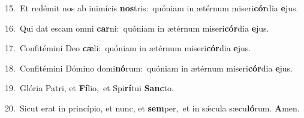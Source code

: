 {\numbfont\textcolor{\numbcolor}{15.}}~Et redémit nos ab inimícis \textbf{nos}\-tris:~\star quóniam in ætérnum miseri\-\textbf{cór}\-dia \textbf{e}\-jus.\par
{\numbfont\textcolor{\numbcolor}{16.}}~Qui dat escam omni \textbf{car}\-ni:~\star quóniam in ætérnum miseri\-\textbf{cór}\-dia \textbf{e}\-jus.\par
{\numbfont\textcolor{\numbcolor}{17.}}~Confitémini Deo \textbf{cæ}\-li:~\star quóniam in ætérnum miseri\-\textbf{cór}\-dia \textbf{e}\-jus.\par
{\numbfont\textcolor{\numbcolor}{18.}}~Confitémini Dómino domi\-\textbf{nó}\-rum:~\star quóniam in ætérnum miseri\-\textbf{cór}\-dia \textbf{e}\-jus.\par
{\numbfont\textcolor{\numbcolor}{19.}}~Glória Patri, et \textbf{Fí}\-lio,~\star et Spi\-\textbf{rí}\-tui \textbf{Sanc}\-to.\par
{\numbfont\textcolor{\numbcolor}{20.}}~Sicut erat in princípio, et nunc, et \textbf{sem}\-per,~\star et in sǽcula sæcu\-\textbf{ló}\-rum. \textbf{A}\-men.\par
